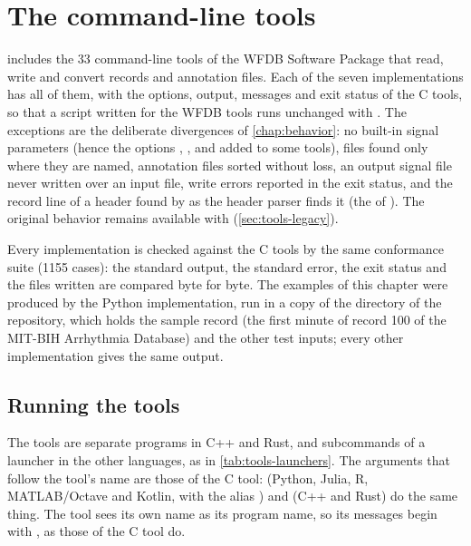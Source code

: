 \chapter{The command-line tools}
\label{chap:tools}

\wfdbx{} includes the 33 command-line tools of the WFDB Software Package \wfdbversion{}
that read, write and convert records and annotation files. Each of the seven
implementations has all of them, with the options, output, messages and exit status of the
C tools, so that a script written for the WFDB tools runs unchanged with \wfdbx{}. The
exceptions are the deliberate divergences of \cref{chap:behavior}: no built-in signal
parameters (hence the options , ,  and  added to some
tools), files found only where they are named, annotation files sorted without loss, an
output signal file never written over an input file, write errors reported in the exit
status, and the record line of a header found by  as the header parser finds
it (the  of ). The original behavior remains available with 
(\cref{sec:tools-legacy}).

Every implementation is checked against the C tools by the same conformance suite (1155
cases): the standard output, the standard error, the exit status and the files written are
compared byte for byte. The examples of this chapter were produced by the Python
implementation, run in a copy of the directory  of the repository, which
holds the sample record  (the first minute of record 100 of the MIT-BIH
Arrhythmia Database) and the other test inputs; every other implementation gives the same
output.

\section{Running the tools}
\label{sec:tools-running}

The tools are separate programs in C++ and Rust, and subcommands of a launcher in the other
languages, as in \cref{tab:tools-launchers}. The arguments that follow the tool's name are
those of the C tool:  (Python, Julia, R, MATLAB/Octave and
Kotlin, with the alias ) and  (C++ and Rust) do the
same thing. The tool sees its own name as its program name, so its messages begin with
, as those of the C tool do.

